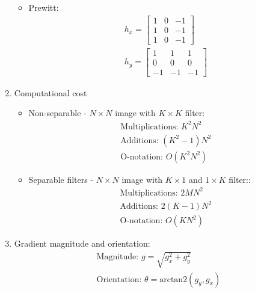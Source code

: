 \documentclass[9pt]{article}
\begin{document}
\begin{multicols*}{2}
\begin{enumerate}
\begin{itemize}
                \item Prewitt:
                {\setlength{\mathindent}{0cm}}
                \begin{gather*}
                    h_{x} = \begin{bmatrix}
                        1 & 0 & -1 \\
                        1 & 0 & -1 \\
                        1 & 0 & -1
                    \end{bmatrix} \\
                    h_{y} = \begin{bmatrix}
                        1 & 1 & 1 \\
                        0 & 0 & 0 \\
                        -1 & -1 & -1
                    \end{bmatrix} 
                \end{gather*}
            \end{itemize}

            \item  Computational cost 
            \begin{itemize}
                \item Non-separable - $N \times N$ image with $K \times K$ filter:
                \begin{gather*}
                    \text{Multiplications: } K^2 N^2 \\ 
                    \text{Additions: } (K^2 - 1) N^2 \\ 
                    \text{O-notation: } O(K^2 N^2)
                \end{gather*}

                \item Separable filters - $N \times N$ image with $K \times 1$ and $1 \times K$ filter:: 
                \begin{gather*}
                    \text{Multiplications: } 2M N^2 \\ 
                    \text{Additions: } 2(K - 1) N^2 \\ 
                    \text{O-notation: } O(K N^2)
                \end{gather*}
            \end{itemize}

            \item Gradient magnitude and orientation: 
            \begin{gather*}
                \text{Magnitude: } g = \sqrt{g_x^2 + g_y^2} \\
                \text{Orientation: } \theta = \text{arctan2}(g_y, g_x)
            \end{gather*}
        \end{enumerate}


\end{multicols*}
\end{document}
